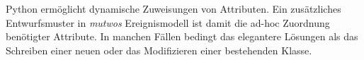 \documentclass[12pt,a4paper,ngerman]{article}
\begin{document}

\hspace{-0.5cm}

Python ermöglicht dynamische Zuweisungen von Attributen.
Ein zusätzliches Entwurfsmuster in \emph{mutwos} Ereignismodell ist damit die ad-hoc Zuordnung benötigter Attribute.
In manchen Fällen bedingt das elegantere Lösungen als das Schreiben einer neuen oder das Modifizieren einer bestehenden Klasse.

\vspace{0.75cm}
\end{document}
